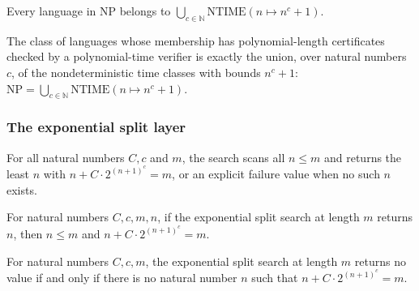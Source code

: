\begin{theorem}
\label{Complexity.NP_subset_iUnion_NTIME}
\leanok
{}
Every language in $\mathrm{NP}$ belongs to
$\bigcup_{c\in\mathbb{N}}\mathrm{NTIME}(n\mapsto n^c+1)$.
\end{theorem}

\begin{theorem}
\label{Complexity.NP_eq_iUnion_NTIME}
\leanok
{}
The class of languages whose membership has polynomial-length certificates checked by a
polynomial-time verifier is exactly the union, over natural numbers $c$, of the
nondeterministic time classes with bounds $n^c+1$:
$\mathrm{NP}=\bigcup_{c\in\mathbb{N}}\mathrm{NTIME}(n\mapsto n^c+1)$.
\end{theorem}

\subsubsection{The exponential split layer}

\begin{definition}
\label{Complexity.e3Split}
\leanok
For all natural numbers $C, c$ and $m$, the search scans all $n \le m$ and returns the least $n$ with $n + C\cdot 2^{(n+1)^c} = m$, or an explicit failure value when no such $n$ exists.
\end{definition}

\begin{lemma}
\label{Complexity.e3_split_spec}
\leanok
{}
For natural numbers $C,c,m,n$, if the exponential split search at length $m$ returns
$n$, then $n\le m$ and $n+C\cdot 2^{(n+1)^c}=m$.
\end{lemma}

\begin{lemma}
\label{Complexity.e3_split_none_iff}
\leanok
{}
For natural numbers $C,c,m$, the exponential split search at length $m$ returns no value
if and only if there is no natural number $n$ such that $n+C\cdot 2^{(n+1)^c}=m$.
\end{lemma}

